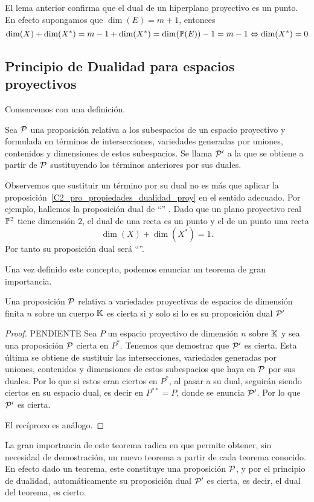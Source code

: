\begin{obs}
	El lema anterior confirma que el dual de un hiperplano proyectivo es un punto. En efecto supongamos que $\dim(E)=m+1$, entonces
	\begin{equation*}
	\dim(X)+\dim(X^*)=m-1+\dim(X^*)=\dim(\mathbb{P}(E))-1=m-1\Leftrightarrow \dim(X^*)=0
	\end{equation*}
\end{obs}

\subsection{Principio de Dualidad para espacios proyectivos}
Comencemos con una definición.
\begin{defi}
	Sea $\mathcal{P}$ una proposición relativa a los subespacios de un espacio proyectivo y formulada en términos de intersecciones, variedades generadas por uniones, contenidos y dimensiones de estos subespacios. Se llama  $\mathcal{P}'$ a la que se obtiene a partir de $\mathcal{P}$ sustituyendo los términos anteriores por sus duales.
\end{defi}
Observemos que sustituir un término por su dual no es más que aplicar la proposición~\ref{C2_pro_propiedades_dualidad_proy} en el sentido adecuado. Por ejemplo, hallemos la proposición dual de ``'' . Dado que un plano proyectivo real $\mathbb{P}^2$ tiene dimensión $2$, el dual de una recta es un punto y el de un punto una recta
\begin{equation*}
\dim(X)+\dim(X^*)=1. 
\end{equation*}
Por tanto su proposición dual será ``''.

Una vez definido este concepto, podemos enunciar un teorema de gran importancia.
\begin{theo} Una proposición $\mathcal{P}$ relativa a variedades proyectivas de espacios de dimensión finita $n$ sobre un cuerpo $\mathbb{K}$ es cierta si y solo si lo es su proposición dual $\mathcal{P}'$
\end{theo}
\begin{proof}PENDIENTE
	Sea $P$ un espacio proyectivo de dimensión $n$ sobre $\mathbb{K}$ y sea una proposición $\mathcal{P}$ cierta en $P^*$. Tenemos que demostrar que $\mathcal{P}'$ es cierta. Esta última se obtiene de sustituir las intersecciones, variedades generadas por uniones, contenidos y dimensiones de estos subespacios que haya en $\mathcal{P}$ por sus duales. Por lo que si estos eran ciertos en $P^*$, al pasar a su dual, seguirán siendo ciertos en su espacio dual, es decir en $P^{**}=P$, donde se enuncia $\mathcal{P}'$. Por lo que $\mathcal{P}'$ es cierta.
	
	El recíproco es análogo.
\end{proof}
La gran importancia de este teorema radica en que permite obtener, sin necesidad de demostración, un nuevo teorema a partir de cada teorema conocido. En efecto dado un teorema, este constituye una proposición $\mathcal{P}$, y por el principio de dualidad, automáticamente su proposición dual $\mathcal{P}'$ es cierta, es decir, el dual del teorema, es cierto.

